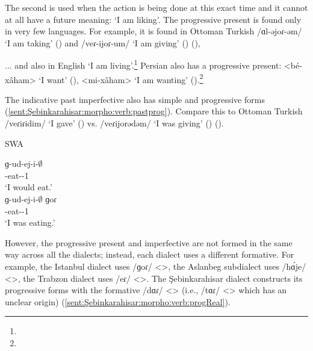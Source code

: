 The second is used when the action is being done at this exact time and it cannot at all have a future meaning: `I am liking'. The progressive present is found only in very few languages. For example, it is found in Ottoman Turkish /ɑl-əjoɾ-əm/ `I am taking' () and /veɾ-ijoɾ-um/ `I am giving' () (),

\begin{adjarianpage}\label{page:175}\end{adjarianpage}%


... and also in English `I am living'.\footnote{} Persian also has a progressive present: <bé-xâham> `I want'  (), <mi-xâham> `I am wanting'  ().\footnote{}


The indicative past imperfective also has simple and progressive forms (\ref{sent:Şebinkarahisar:morpho:verb:pastprog}). Compare this to Ottoman Turkish /veɾiɾidim/ `I gave' () vs. /veɾijorədəm/ `I was giving' () ().



\begin{exe}
	\ex SWA \label{sent:Şebinkarahisar:morpho:verb:pastprog}
	\begin{xlist}
		\ex\gll ɡ-ud-ej-i-$\emptyset$\\
		{\ind}-eat-{\thgloss}-1{\sg} \\
		\trans `I would eat.' \\
		\ex\gll ɡ-ud-ej-i-$\emptyset$ ɡoɾ \\
		{\ind}-eat-{\thgloss}-1{\sg} {\prog} \\
		\trans `I was eating.' \\
	\end{xlist}
\end{exe}


However, the progressive present and imperfective are not formed in the same way across all the dialects; instead, each dialect uses a different formative. For example, the Istanbul dialect uses /ɡoɾ/ <>, the Aslanbeg subdialect uses /h\'ɑje/ <>, the Trabzon dialect uses /eɾ/ <>. The Şebinkarahisar dialect constructs its progressive forms with the formative /dɑɾ/ <> (i.e., /tɑɾ/ <> which has an unclear origin) (\ref{sent:Şebinkarahisar:morpho:verb:progReal}). 


